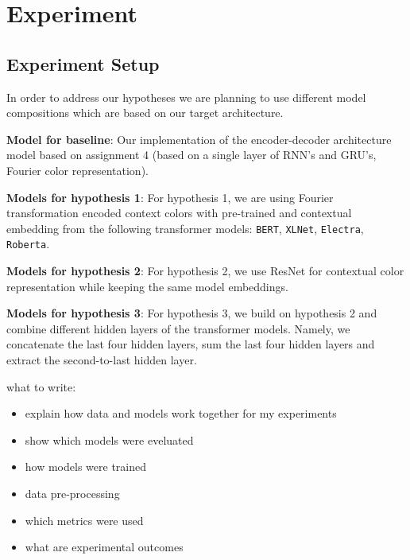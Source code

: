 \section{Experiment}

\subsection{Experiment Setup}
In order to address our hypotheses we are planning to use different model compositions which are based on our target architecture.

\textbf{Model for baseline}:
Our implementation of the encoder-decoder architecture model based on assignment 4 (based on a single layer of RNN’s and GRU’s, Fourier color representation).

\textbf{Models for hypothesis 1}:
For hypothesis 1, we are using Fourier transformation encoded context colors with pre-trained and contextual embedding from the following transformer models: \texttt{BERT}, \texttt{XLNet}, \texttt{Electra}, \texttt{Roberta}.

\textbf{Models for hypothesis 2}:
For hypothesis 2, we use ResNet for contextual color representation while keeping the same model embeddings.

\textbf{Models for hypothesis 3}:
For hypothesis 3, we build on hypothesis 2 and combine different hidden layers of the transformer models. Namely, we concatenate the last four hidden layers, sum the last four hidden layers and extract the second-to-last hidden layer.

\bigbreak
what to write:
\begin{itemize}
  \item explain how data and models work together for my experiments
  \item show which models were eveluated
  \item how models were trained
  \item data pre-processing
  \item which metrics were used
  \item what are experimental outcomes
\end{itemize}